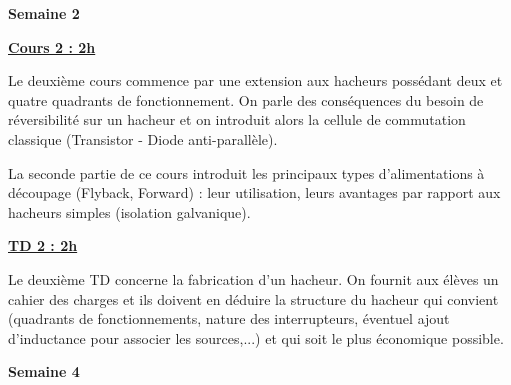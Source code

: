 \documentclass[12pt]{article}
\begin{document}
\vspace{10pt}

\color{red}
\textbf{Semaine 2}

\begin{adjustwidth}{5em}{0pt}
\color{blue}
\hspace{20pt}\textbf{\underline{Cours 2 : 2h}}\par
\vspace{10pt}
\color{black}

Le deuxième cours commence par une extension aux hacheurs possédant deux et quatre quadrants de fonctionnement. On parle des conséquences du besoin de réversibilité sur un hacheur et on introduit alors la cellule de commutation classique (Transistor - Diode anti-parallèle).\par
La seconde partie de ce cours introduit les principaux types d'alimentations à découpage (Flyback, Forward) : leur utilisation, leurs avantages par rapport aux hacheurs simples (isolation galvanique).

\color{blue}
\textbf{\underline{TD 2 : 2h}}\par
\vspace{10pt}
\color{black}

Le deuxième TD concerne la fabrication d'un hacheur. On fournit aux élèves un cahier des charges et ils doivent en déduire la structure du hacheur qui convient (quadrants de fonctionnements, nature des interrupteurs, éventuel ajout d'inductance pour associer les sources,...) et qui soit le plus économique possible.

\end{adjustwidth}

\vspace{10pt}



\vspace{10pt}

\color{red}
\textbf{Semaine 4}
\end{document}
